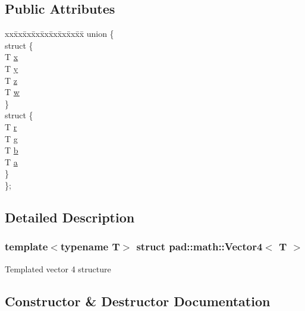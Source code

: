 \subsection*{Public Attributes}
\begin{DoxyCompactItemize}
\item 
\begin{tabbing}
xx\=xx\=xx\=xx\=xx\=xx\=xx\=xx\=xx\=\kill
union \{\\
\>struct \{\\
\>\>T \mbox{\hyperlink{structpad_1_1math_1_1_vector4_a977619c0dbd2e7060bb1f839d3fa8337}{x}}\\
\>\>T \mbox{\hyperlink{structpad_1_1math_1_1_vector4_a2461711530968b1c7c5ff1256a5a6098}{y}}\\
\>\>T \mbox{\hyperlink{structpad_1_1math_1_1_vector4_a9407faaccb5b094aeb3cadc36e71755e}{z}}\\
\>\>T \mbox{\hyperlink{structpad_1_1math_1_1_vector4_abbbd617d5083a886936724282216bee4}{w}}\\
\>\} \\
\>struct \{\\
\>\>T \mbox{\hyperlink{structpad_1_1math_1_1_vector4_a2288e82eaf6dd6c283f4714503b13096}{r}}\\
\>\>T \mbox{\hyperlink{structpad_1_1math_1_1_vector4_ac4a05c791e0522930bed20045239e870}{g}}\\
\>\>T \mbox{\hyperlink{structpad_1_1math_1_1_vector4_a00d2630fa1befcfa4c343e2f4187ec71}{b}}\\
\>\>T \mbox{\hyperlink{structpad_1_1math_1_1_vector4_afb5d50917f750bbe417871b7f290b10c}{a}}\\
\>\} \\
\}; \\

\end{tabbing}\end{DoxyCompactItemize}


\subsection{Detailed Description}
\subsubsection*{template$<$typename T$>$\newline
struct pad\+::math\+::\+Vector4$<$ T $>$}

Templated vector 4 structure 

\subsection{Constructor \& Destructor Documentation}
\mbox{\label{structpad_1_1math_1_1_vector4_a685f645bb73f9e7e2f0cfad10f8c9b3b}} 
